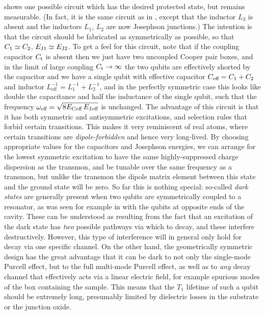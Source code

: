  shows one possible circuit which has the desired protected state, but remains measurable. (In fact, it is the same circuit as in \cite[figure 3]{devoret_quantum_1997}, except that the inductor $L_3$ is absent and the inductors $L_1$, $L_2$ are now Josephson junctions.) The intention is that the circuit should be fabricated as symmetrically as possible, so that $C_{1}\simeq C_{2}$, $E_{\text{J}1}\simeq E_{\text{J}2}$. To get a feel for this circuit, note that if the coupling capacitor $C_\text{t}$ is absent then we just have two uncoupled Cooper pair boxes, and in the limit of large coupling $C_\text{t}\to\infty$ the two qubits are effectively shorted by the capacitor and we have a single qubit with effective capacitor $C_{\text{eff}}=C_{1}+C_{2}$ and inductor $L_\text{eff}^{-1}=L_1^{-1}+L_2^{-1}$, and in the perfectly symmetric case this looks like double the capacitance and half the inductance of the single qubit, such that the frequency $\omega_\text{eff}=\sqrt{\smash[b]{8E_{\text{C}\mkern 1mu\text{eff}}\,E_{\text{J}\mkern 1mu\text{eff}}}}$ is unchanged. The advantage of this circuit is that it has both symmetric and antisymmetric excitations, and selection rules that forbid certain transitions. This makes it very reminiscent of real atoms, where certain transitions are \emph{dipole-forbidden} and hence very long-lived. By choosing appropriate values for the capacitors and Josephson energies, we can arrange for the lowest symmetric excitation to have the same highly-suppressed charge dispersion as the transmon, and be tunable over the same frequency as a transmon, but unlike the transmon the dipole matrix element between this state and the ground state will be zero. So far this is nothing special: so-called \emph{dark states} are generally present when two qubits are symmetrically coupled to a resonator, as was seen for example in \cite{majer_coupling_2007} with the qubits at opposite ends of the cavity. These can be understood as resulting from the fact that an excitation of the dark state has \emph{two} possible pathways via which to decay, and these interfere destructively. However, this type of interference will in general only hold for decay via one specific channel. On the other hand, the geometrically symmetric design has the great advantage that it can be dark to not only the single-mode Purcell effect, but to the full multi-mode Purcell effect, as well as to \emph{any} decay channel that effectively acts via a linear electric field, for example spurious modes of the box containing the sample. This means that the $T_1$ lifetime of such a qubit should be extremely long, presumably limited by dielectric losses in the substrate or the junction oxide.

